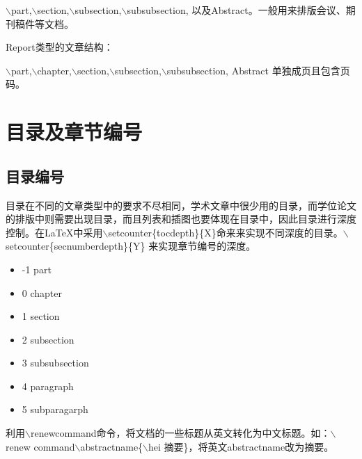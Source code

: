 \documentclass[12pt]{book}
\begin{document}
$\backslash$part,$\backslash$section,$\backslash$subsection,$\backslash$subsubsection, 以及Abstract。一般用来排版会议、期刊稿件等文档。

Report类型的文章结构：

$\backslash$part,$\backslash$chapter,$\backslash$section,$\backslash$subsection,$\backslash$subsubsection, Abstract 单独成页且包含页码。

\section{目录及章节编号}
    
\subsection{目录编号}
    
目录在不同的文章类型中的要求不尽相同，学术文章中很少用的目录，而学位论文的排版中则需要出现目录，而且列表和插图也要体现在目录中，因此目录进行深度控制。在\LaTeX{}中采用$\backslash$setcounter\{tocdepth\}\{X\}命来来实现不同深度的目录。$\backslash$setcounter\{secnumberdepth\}\{Y\} 来实现章节编号的深度。
    
    \begin{center}
        \begin{itemize}
            \item -1 part                    
            \item  0 chapter               
            \item  1 section                
            \item  2 subsection          
            \item  3 subsubsection     
            \item  4 paragraph            
            \item  5 subparagarph   
        \end{itemize}
    \end{center}
    
    
利用$\backslash$renewcommand命令，将文档的一些标题从英文转化为中文标题。如：$\backslash$renew command$\backslash$abstractname\{$\backslash$hei 摘要\}，将英文abstractname改为摘要。
    
%
\end{document}

